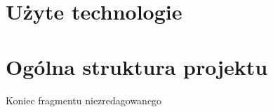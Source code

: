 \section{Użyte technologie}
\label{Chapter63}




\section{Ogólna struktura projektu}
\label{Chapter64}











{\color{red}Koniec fragmentu niezredagowanego}